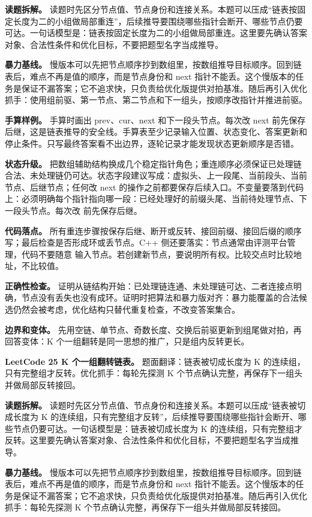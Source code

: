 \textbf{读题拆解。} 读题时先区分节点值、节点身份和连接关系。本题可以压成“链表按固定长度为二的小组做局部重连”，后续推导要围绕哪些指针会断开、哪些节点仍要可达。一句话模型是：链表按固定长度为二的小组做局部重连。这里要先确认答案对象、合法性条件和优化目标，不要把题型名字当成推导。

\textbf{暴力基线。} 慢版本可以先把节点顺序抄到数组里，按数组推导目标顺序。回到链表后，难点不再是值的顺序，而是节点身份和 next 指针不能丢。这个慢版本的任务是保证不漏答案；它不追求快，只负责给优化版提供对拍基准。随后再引入优化抓手：使用组前驱、第一节点、第二节点和下一组头，按顺序改指针并推进前驱。

\textbf{手算样例。} 手算时画出 prev、cur、next 和下一段头节点。每次改 next 前先保存后继，这是链表推导的安全线。手算表至少记录输入位置、状态变化、答案更新和停止条件。只写最终答案看不出边界，逐轮记录才能发现状态更新顺序是否错。

\textbf{状态升级。} 把数组辅助结构换成几个稳定指针角色；重连顺序必须保证已处理链合法、未处理链仍可达。状态字段建议写成：虚拟头、上一段尾、当前段头、当前节点、后继节点；任何改 next 的操作之前都要保存后续入口。不变量要落到代码上：必须明确每个指针指向哪一段：已经处理好的前缀头尾、当前待处理节点、下一段头节点。每次改  前先保存后继。

\textbf{代码落点。} 所有重连步骤按保存后继、断开或反转、接回前缀、接回后缀的顺序写；最后检查是否形成环或丢节点。C++ 侧还要落实：节点通常由评测平台管理，代码不要随意  输入节点。若创建新节点，要说明所有权。比较交点时比较地址，不比较值。

\textbf{正确性检查。} 证明从链结构开始：已处理链连通、未处理链可达、二者连接点明确，节点没有丢失也没有成环。证明时把算法和暴力版对齐：暴力能覆盖的合法候选仍然会被考虑，优化结构只替代重复检查，不改变答案集合。

\textbf{边界和变体。} 先用空链、单节点、奇数长度、交换后前驱更新到组尾做对拍，再回答变体：K 个一组翻转是同一思想的推广，只是组内反转更长。

\noindent\textbf{LeetCode 25 K 个一组翻转链表。} 题面翻译：链表被切成长度为 K 的连续组，只有完整组才反转。优化抓手：每轮先探测 K 个节点确认完整，再保存下一组头并做局部反转接回。

\textbf{读题拆解。} 读题时先区分节点值、节点身份和连接关系。本题可以压成“链表被切成长度为 K 的连续组，只有完整组才反转”，后续推导要围绕哪些指针会断开、哪些节点仍要可达。一句话模型是：链表被切成长度为 K 的连续组，只有完整组才反转。这里要先确认答案对象、合法性条件和优化目标，不要把题型名字当成推导。

\textbf{暴力基线。} 慢版本可以先把节点顺序抄到数组里，按数组推导目标顺序。回到链表后，难点不再是值的顺序，而是节点身份和 next 指针不能丢。这个慢版本的任务是保证不漏答案；它不追求快，只负责给优化版提供对拍基准。随后再引入优化抓手：每轮先探测 K 个节点确认完整，再保存下一组头并做局部反转接回。

